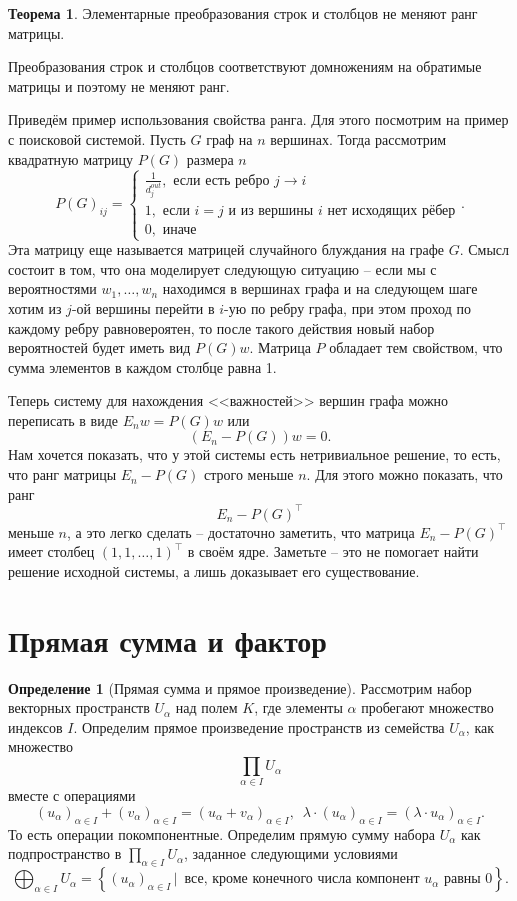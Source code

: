 \documentclass[10pt,a4paper,oneside]{book} %
\theoremstyle{definition}
\newtheorem*{defn}{Определение}
\newtheorem{thm}{Теорема}
\def\thrm{\begin{thm}}
\def\ethrm{\end{thm}}
\def\dfn{\begin{defn}}
\def\edfn{\end{defn}}
\begin{document}
\thrm
Элементарные преобразования строк и столбцов не меняют ранг матрицы.

\ethrm
\proof Преобразования строк и столбцов соответствуют домножениям на обратимые матрицы и поэтому не меняют ранг.
\endproof

Приведём пример использования свойства ранга. Для этого посмотрим на пример с поисковой системой. Пусть $G$ граф на $n$ вершинах. Тогда рассмотрим квадратную матрицу $P(G)$ размера $n$
$$P(G)_{ij}= \begin{cases} \frac{1}{d_j^{out}}, \text{ если есть ребро $j \to i$} \\
1, \text{ если $i=j$ и из вершины $i$ нет исходящих рёбер}\\
0, \text{ иначе }
\end{cases}.$$
Эта матрицу еще называется матрицей случайного блуждания на графе $G$. Смысл состоит в том, что она моделирует следующую ситуацию -- если мы с вероятностями $w_1,\dots,w_n$ находимся в вершинах графа и на следующем шаге хотим из $j$-ой вершины перейти в $i$-ую по ребру графа, при этом проход по каждому ребру равновероятен, то после такого действия новый набор вероятностей будет иметь вид $P(G)w$. Матрица $P$ обладает тем свойством, что сумма элементов в каждом столбце равна 1.

Теперь систему для нахождения <<важностей>> вершин графа можно переписать в виде $E_n w= P(G)w$ или
$$(E_n - P(G))w=0.$$
Нам хочется показать, что у этой системы есть нетривиальное решение, то есть, что ранг матрицы $E_n- P(G)$ строго меньше $n$. Для этого можно показать, что ранг
$$E_n - P(G)^{\top}$$
меньше $n$, а это легко сделать -- достаточно заметить, что матрица $E_n - P(G)^{\top}$  имеет столбец $(1,1,\dots, 1)^{\top}$ в своём ядре. Заметьте -- это не помогает найти решение исходной системы, а лишь доказывает его существование.






\section{Прямая сумма и фактор}

\dfn[Прямая сумма и прямое произведение] Рассмотрим набор векторных пространств $U_{\alpha}$ над полем $K$,  где элементы $\alpha$ пробегают множество индексов $I$. Определим прямое произведение пространств из семейства $U_{\alpha}$, как множество
$$\prod_{\alpha \in I} U_{\alpha}$$
вместе с операциями $$(u_{\alpha})_{\alpha\in I}+ (v_{\alpha})_{\alpha\in I}=(u_{\alpha}+v_{\alpha})_{\alpha\in I},\,\,\, \lambda \cdot (u_{\alpha})_{\alpha\in I}= (\lambda \cdot u_{\alpha})_{\alpha\in I}.$$
То есть операции покомпонентные. Определим прямую сумму набора $U_{\alpha}$ как подпространство в $\prod_{\alpha \in I} U_{\alpha}$, заданное следующими условиями
$$\bigoplus_{\alpha \in I } U_{\alpha}=\left\{ (u_{\alpha})_{\alpha \in I} \,|\, \text{ все, кроме конечного числа компонент $u_{\alpha}$ равны 0}\right\}.$$
\edfn
\end{document}
